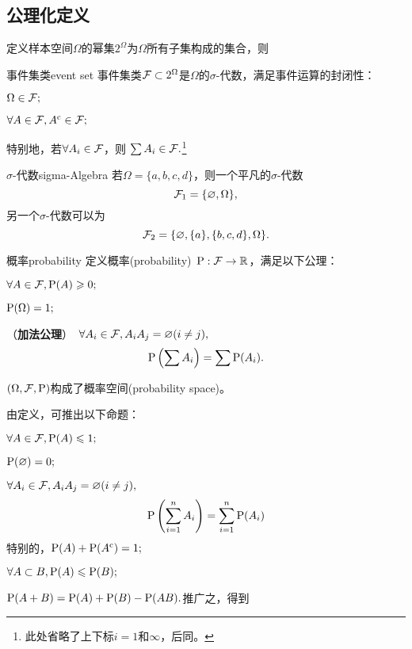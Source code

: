 \subsection{公理化定义}
定义样本空间$\Omega$的幂集$2^\Omega$为$\Omega$所有子集构成的集合，则
\begin{definition}{事件集类}{event set}
	事件集类$\cF\subset 2^\Omega$是$\Omega$的$\sigma$-代数，满足事件运算的封闭性：
	\begin{compactenum}
		\item $\Omega \in \cF;$
		\item $\forall A \in \cF, A\c \in \cF;$
		\item 特别地，若$\forall A_i \in \cF$，则
		$
			\sum A_i \in \cF.
		$\footnote{此处省略了上下标$i=1$和$\infty$，后同。}
	\end{compactenum}
\end{definition}
\begin{example}{$\sigma$-代数}{sigma-Algebra}
	若$\Omega=\{a,b,c,d\}$，则一个平凡的$\sigma$-代数
	\[
		\cF_1=\{\varnothing, \Omega\},
	\]
	另一个$\sigma$-代数可以为
	\[
		\cF_2=\{\varnothing, \{a\},\{b,c,d\},\Omega\}.
	\]
\end{example}
\begin{definition}{概率}{probability}
	定义概率(probability)~$\P:\cF\to\RR$，满足以下公理：
	\begin{compactenum}
		\item $\forall A\in\cF,\P(A)\geqslant 0;$
		\item $\P (\Omega)=1;$
		\item （\textbf{加法公理}）~$\forall A_i \in \cF,A_iA_j=\varnothing(i\neq j),$
		\begin{align}
			\P\kh{\sum A_i}=\sum\P(A_i).
		\end{align}
	\end{compactenum}
	$(\Omega,\cF,\P)$构成了概率空间(probability space)。
\end{definition}
由定义，可推出以下命题：
\begin{compactenum}
	\item $\forall A\in\cF,\P(A)\leqslant 1;$
	\item $\P(\varnothing)=0;$
	\item $\forall A_i \in \cF,A_iA_j=\varnothing(i\neq j),$
	\[
		\P\kh{\sum_{i=1}^n A_i}=\sum_{i=1}^n\P(A_i)
	\]
	特别的，$\P(A)+\P(A\c)=1;$
	\item $\forall A\subset B,\P(A)\leqslant\P(B);$
	\item $\P(A+B)=\P(A)+\P(B)-\P(AB).$推广之，得到
\end{compactenum}
